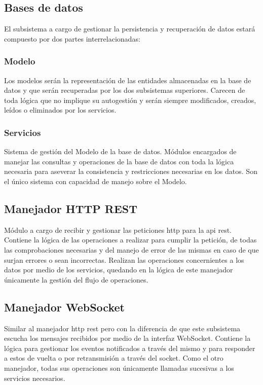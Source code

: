 \subsection{Bases de datos}

El subsistema a cargo de gestionar la persistencia y recuperación de datos estará compuesto por dos partes interrelacionadas:

\subsubsection{Modelo}

Los modelos serán la representación de las entidades almacenadas en la base de datos y que serán recuperadas por los dos subsistemas superiores. Carecen de toda lógica que no implique su autogestión y serán siempre modificados, creados, leídos o eliminados por los servicios.

\subsubsection{Servicios}

Sistema de gestión del Modelo de la base de datos. Módulos encargados de manejar las consultas y operaciones de la base de datos con toda la lógica necesaria para aseverar la consistencia y restricciones necesarias en los datos. Son el único sistema con capacidad de manejo sobre el Modelo.

\subsection{Manejador HTTP REST}

Módulo a cargo de recibir y gestionar las peticiones \acrshort{http} para la \acrshort{api} \acrshort{rest}. Contiene la lógica de las operaciones a realizar para cumplir la petición, de todas las comprobaciones necesarias y del manejo de error de las mismas en caso de que surjan errores o sean incorrectas. Realizan las operaciones concernientes a los datos por medio de los servicios, quedando en la lógica de este manejador únicamente la gestión del flujo de operaciones.

\subsection{Manejador WebSocket}

Similar al manejador \acrshort{http} \acrshort{rest} pero con la diferencia de que este subsistema escucha los mensajes recibidos por medio de la interfaz WebSocket. Contiene la lógica para gestionar los eventos notificados a través del mismo y para responder a estos de vuelta o por retransmisión a través del socket. Como el otro manejador, todas sus operaciones son únicamente llamadas sucesivas a los servicios necesarios.

